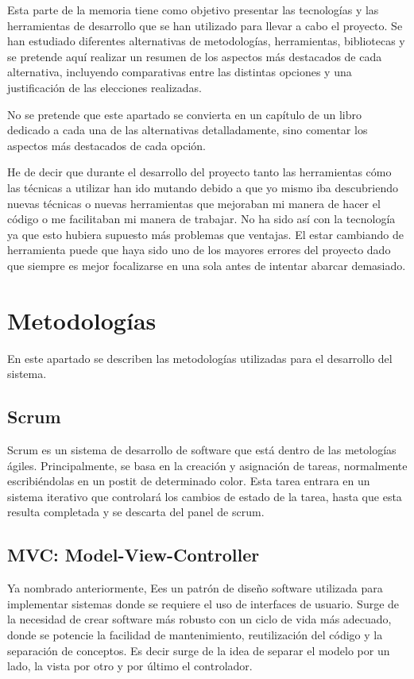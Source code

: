 
Esta parte de la memoria tiene como objetivo presentar las tecnologías y las herramientas de desarrollo que se han utilizado para llevar a cabo el proyecto. Se han estudiado diferentes alternativas de metodologías, herramientas, bibliotecas  y se pretende aquí realizar un resumen de los aspectos más destacados de cada alternativa, incluyendo comparativas entre las distintas opciones y una justificación de las elecciones realizadas. 

No se pretende que este apartado se convierta en un capítulo de un libro dedicado a cada una de las alternativas detalladamente, sino comentar los aspectos más destacados de cada opción.

He de decir que durante el desarrollo del proyecto tanto las herramientas cómo las técnicas a utilizar han ido mutando debido a que yo mismo iba descubriendo nuevas técnicas o nuevas herramientas que mejoraban mi manera de hacer el código o me facilitaban mi manera de trabajar. No ha sido así con la tecnología ya que esto hubiera supuesto más problemas que ventajas. El estar cambiando de herramienta puede que haya sido uno de los mayores errores del proyecto dado que siempre es mejor focalizarse en una sola antes de intentar abarcar demasiado. 


\section{Metodologías}\label{metodologias}
En este apartado se describen las metodologías utilizadas para el desarrollo del sistema.

\subsection{Scrum}\label{scrum}
Scrum es un sistema de desarrollo de software que está dentro de las metologías ágiles. Principalmente, se basa en la creación y asignación de tareas, normalmente escribiéndolas en un postit de determinado color. Esta tarea entrara en un sistema iterativo que controlará los cambios de estado de la tarea, hasta que esta resulta completada y se descarta del panel de scrum.

\subsection{MVC: Model-View-Controller}\label{mvc}
Ya nombrado anteriormente, Ees un patrón de diseño software utilizada para implementar sistemas donde se requiere el uso de interfaces de usuario. Surge de la necesidad de crear software más robusto con un ciclo de vida más adecuado, donde se potencie la facilidad de mantenimiento, reutilización del código y la separación de conceptos. Es decir surge de la idea de separar el modelo por un lado, la vista por otro y por último el controlador.


